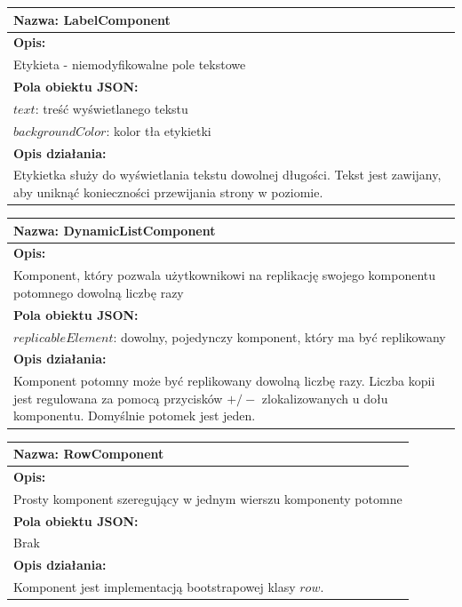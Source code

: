 \documentclass[licencjacka]{pracamgr}
\begin{document}
\begin{tabularx}{\linewidth}{|X|}\hline
\textbf{Nazwa:}
LabelComponent
\\\hline
\textbf{Opis:}\\

Etykieta - niemodyfikowalne pole tekstowe\\
\hline
\textbf{Pola obiektu JSON:} \\
$text$: treść wyświetlanego tekstu\\
$backgroundColor$: kolor tła etykietki\\
\hline
\textbf{Opis działania:}\\
Etykietka służy do wyświetlania tekstu dowolnej długości. Tekst jest zawijany, aby uniknąć konieczności przewijania strony w poziomie.
\\\hline
\end{tabularx}

\begin{tabularx}{\linewidth}{|X|}\hline
\textbf{Nazwa:}
DynamicListComponent
\\\hline
\textbf{Opis:}\\

Komponent, który pozwala użytkownikowi na replikację swojego komponentu potomnego dowolną liczbę razy\\
\hline
\textbf{Pola obiektu JSON:} \\
$replicableElement$: dowolny, pojedynczy komponent, który ma być replikowany\\
\hline
\textbf{Opis działania:}\\
Komponent potomny może być replikowany dowolną liczbę razy. Liczba kopii jest regulowana za pomocą przycisków $+/-$ zlokalizowanych u dołu komponentu. Domyślnie potomek jest jeden.
\\\hline
\end{tabularx}


\begin{tabularx}{\linewidth}{|l|}\hline
\textbf{Nazwa:}
RowComponent
\\\hline
\textbf{Opis:}\\

Prosty komponent szeregujący w jednym wierszu komponenty potomne\\
\hline
\textbf{Pola obiektu JSON:} \\
Brak\\
\hline
\textbf{Opis działania:}\\
Komponent jest implementacją bootstrapowej klasy $row$.
\\\hline
\end{tabularx}
\end{document}
